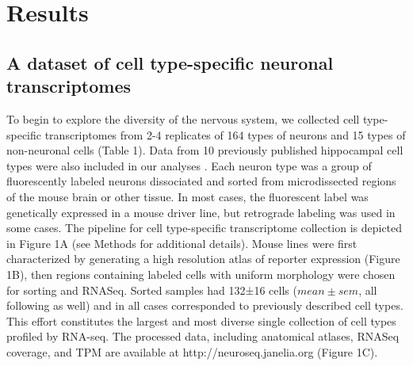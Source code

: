 \section{Results}

\subsection{A dataset of cell type-specific neuronal transcriptomes}
To begin to explore the diversity of the nervous system, we collected cell type-specific transcriptomes from 2-4 replicates of 164 types of neurons and 15 types of non-neuronal cells (Table 1). Data from 10 previously published hippocampal cell types were also included in our analyses \cite{Cembrowski_2016}. Each neuron type was a group of fluorescently labeled neurons dissociated and sorted from microdissected regions of the mouse brain or other tissue. In most cases, the fluorescent label was genetically expressed in a mouse driver line, but retrograde labeling was used in some cases. The pipeline for cell type-specific transcriptome collection is depicted in Figure 1A (see Methods for additional details). Mouse lines were first characterized by generating a high resolution atlas of reporter expression (Figure 1B), then regions containing labeled cells with uniform morphology were chosen for sorting and RNASeq. Sorted samples had 132±16 cells ($mean\pm sem$, all following as well) and in all cases corresponded to previously described cell types. This effort constitutes the largest and most diverse single collection of cell types profiled by RNA-seq. The processed data, including anatomical atlases, RNASeq coverage, and TPM are available at http://neuroseq.janelia.org (Figure 1C). 

